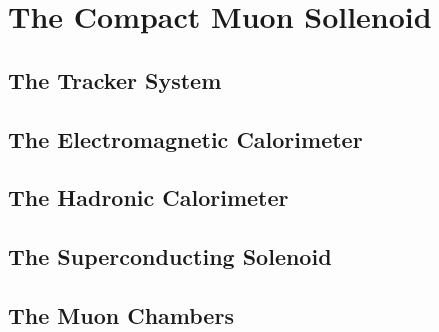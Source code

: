 \section{The Compact Muon Sollenoid}
\subsection{The Tracker System}
\subsection{The Electromagnetic Calorimeter}
\subsection{The Hadronic Calorimeter}
\subsection{The Superconducting Solenoid}
\subsection{The Muon Chambers}